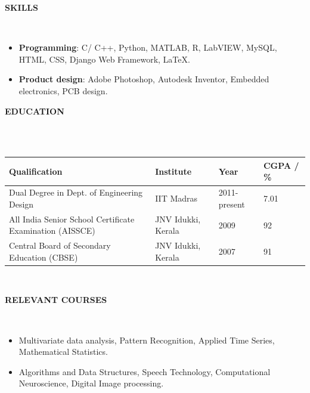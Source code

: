 \documentclass[a4paper,10pt]{article}
\newcommand{\lsep}{-0.5cm}
\newcommand{\resheading}[1]{{\small \colorbox{mygrey}{\begin{minipage}{0.975\textwidth}{\textbf{#1 \vphantom{p\^{E}}}}\end{minipage}}}}
\begin{document}
\resheading{\textbf{SKILLS} }\\[\lsep]
\begin{itemize}
    \vspace{3pt}
    \item \textbf{Programming}: C/ C++, Python, MATLAB, R, LabVIEW, MySQL, HTML, CSS, Django Web Framework, \LaTeX.\vspace{-5pt}
    \item \textbf{Product design}: Adobe Photoshop, Autodesk Inventor, Embedded electronics, PCB design.
\end{itemize}

\resheading{\textbf{EDUCATION} }\\[\lsep]
\\

\indent \begin{tabularx}{0.97\textwidth}{ X  p{3.4cm}  p{2.3cm} p{2cm} }
    \hline
    \textbf{Qualification}                             & \textbf{Institute} & \textbf{Year} & \textbf{CGPA / \%} \\
    \hline
    Dual Degree in Dept. of Engineering Design & IIT Madras         & 2011-present  & 7.01\\
    All India Senior School Certificate Examination (AISSCE) & JNV Idukki, Kerala & 2009          & 92                 \\
    Central Board of Secondary Education (CBSE)              & JNV Idukki, Kerala & 2007          & 91                 \\
    \hline
\end{tabularx}
\\

\resheading{\textbf{RELEVANT COURSES} }\\[\lsep]
\begin{itemize}
    \vspace{3pt}
    \item Multivariate data analysis, Pattern Recognition, Applied Time Series, Mathematical Statistics.\vspace{-5pt}
    \item Algorithms and Data Structures, Speech Technology,  Computational Neuroscience, Digital Image processing.
\end{itemize}
\end{document}
